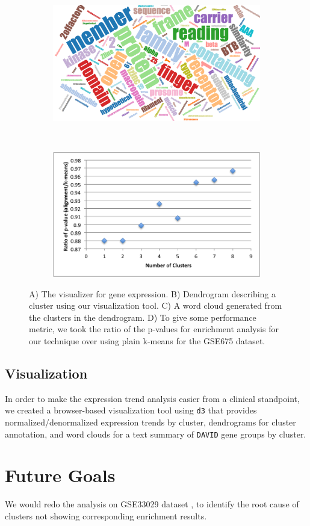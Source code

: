 \documentclass[aps,prd,final,onecolumn,a4paper,10pt]{revtex4}
\begin{document}
\begin{figure}[H]
  \begin{subfigure}[b]{0.5\textwidth}
    \includegraphics[width=.7\textwidth]{wordcloud.png}
    \label{fig:wordcloud}
  \end{subfigure}%
  ~
  \begin{subfigure}[b]{0.5\textwidth}
    \includegraphics[width=.5\textwidth]{pvalue_performace.png}
    \label{fig:pvalue}
  \end{subfigure}%
  \label{fig:enrichment}
  \caption{A) The visualizer for gene expression. B) Dendrogram describing a cluster using our visualization tool. C) A word cloud generated from the clusters in the dendrogram. D) To give some performance metric, we took the ratio of the p-values for enrichment analysis for our technique over using plain k-means for the GSE675 dataset.}
\end{figure}


\subsection{Visualization}

In order to make the expression trend analysis easier from a clinical standpoint, we created a browser-based visualization tool using \verb!d3! that provides normalized/denormalized expression trends by cluster, dendrograms for cluster annotation, and word clouds for a text summary of \verb!DAVID! gene groups by cluster.

\section{Future Goals}
We would redo the analysis on GSE33029 dataset , to identify the root cause of clusters not showing corresponding enrichment results. 
\end{document}
